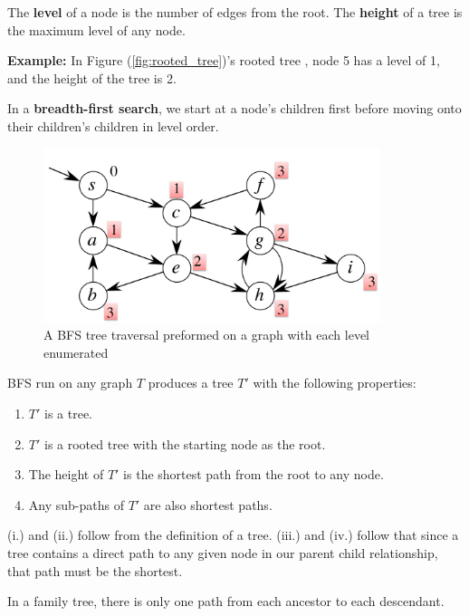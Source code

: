 \begin{Def}

    The \textbf{level} of a node is the number of edges from the root. The \textbf{height} of a tree is the maximum level of any node.
\end{Def}
\textbf{Example:} In Figure (\ref{fig:rooted_tree})'s rooted tree , node 5 has a level of 1, and the height of the tree is 2.
\newpage
\begin{Def}

    In a \textbf{breadth-first search}, we start at a node's children first before moving onto their children's children in level order.
\end{Def}
\begin{figure}[h]
    \begin{center}
      \includegraphics[height=2in]{./Sections/graphs/bfs.png}
    \end{center}
     \caption{A BFS tree traversal preformed on a graph with each level enumerated}\label{fig:bfs}
  \end{figure}

\begin{theo}
    
    BFS run on any graph $T$ produces a tree $T'$ with the following properties:
    \begin{enumerate}
        \item [(i.)] $T'$ is a tree.
        \item [(ii.)] $T'$ is a rooted tree with the starting node as the root.
        \item [(iii.)] The height of $T'$ is the shortest path from the root to any node.
        \item [(iv.)] Any sub-paths of $T'$ are also shortest paths.
    \end{enumerate}
\end{theo}
\begin{Proof}

    (i.) and (ii.) follow from the definition of a tree. (iii.) and (iv.) follow that since a tree 
    contains a direct path to any given node in our parent child relationship, that path must be the shortest.
\end{Proof}
\begin{Tip}
    In a family tree, there is only one path from each ancestor to each descendant.
\end{Tip}

